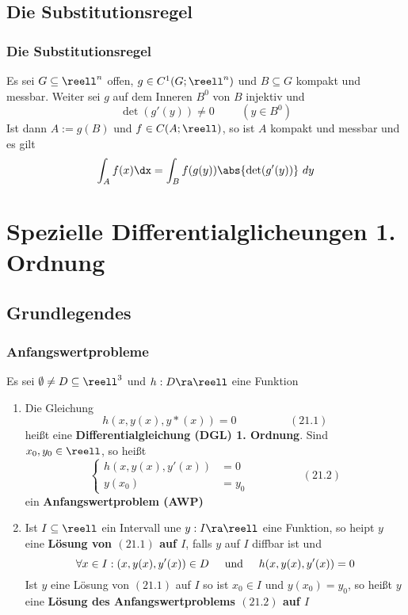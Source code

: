 \documentclass{kit}
\begin{document}
  \subsection{Die Substitutionsregel}
    \subsubsection{Die Substitutionsregel}  
      Es sei $G\subseteq\reell^n$ offen, $g\in C^1(G;\reell^n)$ und $B\subseteq G$ kompakt und messbar. Weiter sei $g$
      auf dem Inneren $B^0$ von $B$ injektiv und
      $$\det(g'(y))\neq0\hspace{1cm}(y\in B^0)$$
      Ist dann $A:=g(B)$ und $f\in C(A;\reell)$, so ist $A$ kompakt und messbar und es gilt
      $$\int_Af(x)\dx=\int_Bf(g(y))\abs{\det(g'(y))}\ dy$$
\section{Spezielle Differentialglicheungen 1. Ordnung}
  \subsection{Grundlegendes}
    \subsubsection{Anfangswertprobleme}
      Es sei $\emptyset\neq D\subseteq\reell^3$ und $h:D\ra\reell$ eine Funktion
      \begin{enumerate}
        \item Die Gleichung
          $$h(x,y(x),y*(x))=0\hspace{2cm}(21.1)$$
          heißt eine \textbf{Differentialgleichung (DGL) 1. Ordnung}. Sind $x_0,y_0\in\reell$, so heißt
          $$\begin{cases}
            h(x,y(x),y'(x)) & =0\\
            y(x_0) & =y_0
          \end{cases}\hspace{2cm}(21.2)$$
          ein \textbf{Anfangswertproblem (AWP)}
        \item Ist $I\subseteq\reell$ ein Intervall une $y:I\ra\reell$ eine Funktion, so heipt $y$ eine \textbf{Lösung von
          $(21.1)$ auf $I$}, falls $y$ auf $I$ diffbar ist und
          $$\forall x\in I:(x,y(x),y'(x))\in D\hspace{0.5cm}\text{und}\hspace{0.5cm}h(x,y(x),y'(x))=0$$
          Ist $y$ eine Lösung von $(21.1)$ auf $I$ so ist $x_0\in I$ und $y(x_0)=y_0$, so heißt $y$ eine
          \textbf{Lösung des Anfangswertproblems $(21.2)$ auf $I$}
      \end{enumerate}
\end{document}
